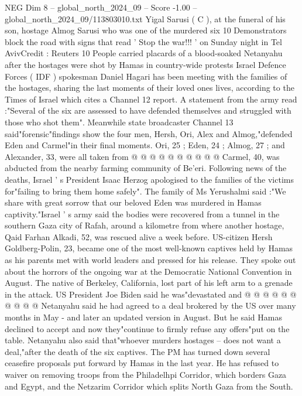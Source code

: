 \begin{textsample}{NEG Dim 8 – global\_north\_2024\_09 – Score -1.00 – global\_north\_2024\_09/113803010.txt}  \label{ex:f8_neg_153}
Yigal Sarusi ( C ), at the funeral of his son, hostage Almog Sarusi who was one of the murdered six 10 Demonstrators block the road with signs that read ' Stop the war!!! ' on Sunday night in Tel AvivCredit : Reuters 10 People carried placards of a blood-soaked Netanyahu after the hostages were shot by Hamas in country-wide protests Israel Defence Forces ( IDF ) spokesman Daniel Hagari has been meeting with the families of the hostages, sharing the last moments of their loved ones lives, according to the Times of Israel which cites a Channel 12 report.
A statement from the army read :"Several of the six are assessed to have defended themselves and struggled with those who shot them".
Meanwhile state broadcaster Channel 13 said"forensic"findings show the four men, Hersh, Ori, Alex and Almog,"defended Eden and Carmel"in their final moments.
Ori, 25 ; Eden, 24 ; Almog, 27 ; and Alexander, 33, were all taken from @ @ @ @ @ @ @ @ @ @ Carmel, 40, was abducted from the nearby farming community of Be'eri.
Following news of the deaths, Israel ' s President Isaac Herzog apologised to the families of the victims for"failing to bring them home safely".
The family of Ms Yerushalmi said :"We share with great sorrow that our beloved Eden was murdered in Hamas captivity."Israel ' s army said the bodies were recovered from a tunnel in the southern Gaza city of Rafah, around a kilometre from where another hostage, Qaid Farhan Alkadi, 52, was rescued alive a week before.
US-citizen Hersh Goldberg-Polin, 23, became one of the most well-known captives held by Hamas as his parents met with world leaders and pressed for his release.
They spoke out about the horrors of the ongoing war at the Democratic National Convention in August.
The native of Berkeley, California, lost part of his left arm to a grenade in the attack.
US President Joe Biden said he was"devastated and @ @ @ @ @ @ @ @ @ @ Netanyahu said he had agreed to a deal brokered by the US over many months in May - and later an updated version in August.
But he said Hamas declined to accept and now they"continue to firmly refuse any offers"put on the table.
Netanyahu also said that"whoever murders hostages -- does not want a deal,"after the death of the six captives.
The PM has turned down several ceasefire proposals put forward by Hamas in the last year.
He has refused to waiver on removing troops from the Philadelhpi Corridor, which borders Gaza and Egypt, and the Netzarim Corridor which splits North Gaza from the South.

\end{textsample}
